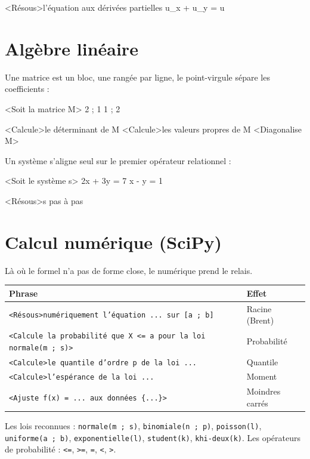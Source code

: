 \documentclass[11pt,a4paper]{article}
\newcommand{\bal}[1]{\texttt{#1}}
\begin{document}
\begin{code}
<Résous>l'équation aux dérivées partielles u_x + u_y = u
\end{code}

\section{Algèbre linéaire}

Une matrice est un bloc, une rangée par ligne, le point-virgule sépare
les coefficients :

\begin{code}
<Soit la matrice M>{
    2 ; 1
    1 ; 2
}

<Calcule>le déterminant de M
<Calcule>les valeurs propres de M
<Diagonalise M>
\end{code}

Un système s'aligne seul sur le premier opérateur relationnel :

\begin{code}
<Soit le système s>{
    2x + 3y = 7
    x - y = 1
}

<Résous>s pas à pas
\end{code}

\section{Calcul numérique (SciPy)}

Là où le formel n'a pas de forme close, le numérique prend le relais.

\begin{longtable}{@{}ll@{}}
\toprule
\textbf{Phrase} & \textbf{Effet} \\
\midrule
\bal{<Résous>numériquement l'équation ... sur [a ; b]} & Racine (Brent) \\
\bal{<Calcule la probabilité que X <= a pour la loi normale(m ; s)>} & Probabilité \\
\bal{<Calcule>le quantile d'ordre p de la loi ...} & Quantile \\
\bal{<Calcule>l'espérance de la loi ...} & Moment \\
\bal{<Ajuste f(x) = ... aux données \{...\}>} & Moindres carrés \\
\bottomrule
\end{longtable}

Les lois reconnues : \bal{normale(m ; s)}, \bal{binomiale(n ; p)},
\bal{poisson(l)}, \bal{uniforme(a ; b)}, \bal{exponentielle(l)},
\bal{student(k)}, \bal{khi-deux(k)}. Les opérateurs de probabilité :
\bal{<=}, \bal{>=}, \bal{=}, \bal{<}, \bal{>}.
\end{document}
